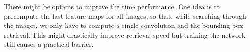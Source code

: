 There might be options to improve the time performance. One idea is to precompute the last feature maps for all images, so that, while searching through the images, we only have to compute a single convolution and the bounding box retrieval. This might drastically improve retrieval speed but training the network still causes a practical barrier.
